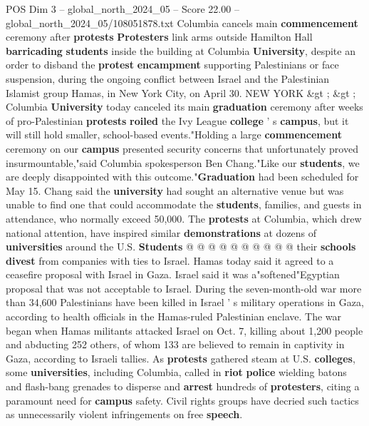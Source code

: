 \begin{textsample}{POS Dim 3 – global\_north\_2024\_05 – Score 22.00 – global\_north\_2024\_05/108051878.txt}  \label{ex:f3_pos_011}
Columbia cancels main \textbf{commencement} ceremony after \textbf{protests} \textbf{Protesters} link arms outside Hamilton Hall \textbf{barricading} \textbf{students} inside the building at Columbia \textbf{University}, despite an order to disband the \textbf{protest} \textbf{encampment} supporting Palestinians or face suspension, during the ongoing conflict between Israel and the Palestinian Islamist group Hamas, in New York City, on April 30.
NEW YORK \&gt ; \&gt ; Columbia \textbf{University} today canceled its main \textbf{graduation} ceremony after weeks of pro-Palestinian \textbf{protests} \textbf{roiled} the Ivy League \textbf{college} ' s \textbf{campus}, but it will still hold smaller, school-based events."Holding a large \textbf{commencement} ceremony on our \textbf{campus} presented security concerns that unfortunately proved insurmountable,"said Columbia spokesperson Ben Chang."Like our \textbf{students}, we are deeply disappointed with this outcome."\textbf{Graduation} had been scheduled for May 15.
Chang said the \textbf{university} had sought an alternative venue but was unable to find one that could accommodate the \textbf{students}, families, and guests in attendance, who normally exceed 50,000.
The \textbf{protests} at Columbia, which drew national attention, have inspired similar \textbf{demonstrations} at dozens of \textbf{universities} around the U.S. \textbf{Students} @ @ @ @ @ @ @ @ @ @ their \textbf{schools} \textbf{divest} from companies with ties to Israel.
Hamas today said it agreed to a ceasefire proposal with Israel in Gaza.
Israel said it was a"softened"Egyptian proposal that was not acceptable to Israel.
During the seven-month-old war more than 34,600 Palestinians have been killed in Israel ' s military operations in Gaza, according to health officials in the Hamas-ruled Palestinian enclave.
The war began when Hamas militants attacked Israel on Oct. 7, killing about 1,200 people and abducting 252 others, of whom 133 are believed to remain in captivity in Gaza, according to Israeli tallies.
As \textbf{protests} gathered steam at U.S. \textbf{colleges}, some \textbf{universities}, including Columbia, called in \textbf{riot} \textbf{police} wielding batons and flash-bang grenades to disperse and \textbf{arrest} hundreds of \textbf{protesters}, citing a paramount need for \textbf{campus} safety.
Civil rights groups have decried such tactics as unnecessarily violent infringements on free \textbf{speech}.

\end{textsample}
